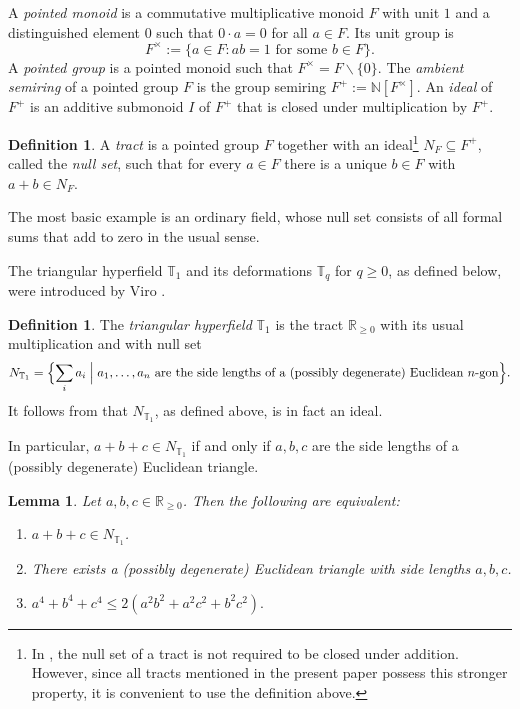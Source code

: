 \documentclass[12pt]{amsart}
\newtheorem{lemma}[theorem]{Lemma}
\theoremstyle{definition}
\newtheorem{definition}[theorem]{Definition}
\newcommand{\1}{\mathbf{1}}
\newcommand\N{{\mathbb N}}
\newcommand\R{{\mathbb R}}
\newcommand\T{{\mathbb T}}
\renewcommand{\setminus}{\backslash}
\newcommand{\mk}[2][]{\todo[color=orange, #1]{\textbf{Mario}: #2}}
\begin{document}
A \emph{pointed monoid} is a commutative multiplicative monoid $F$ with unit $1$ and
a distinguished element $0$ such that $0\cdot a=0$ for all $a\in F$. Its unit group is
\[
F^\times := \{a\in F : ab=1 \text{ for some } b\in F\}.
\]
A \emph{pointed group} is a pointed monoid such that $F^\times = F\setminus\{0\}$. The \emph{ambient semiring} of a pointed group $F$ is the group semiring $F^+ := \N[F^\times]$. An \emph{ideal} of $F^+$ is an additive submonoid $I$ of $F^+$ that is closed under multiplication by $F^+$.

\begin{definition}
A \emph{tract} is a pointed group $F$ together with an ideal\footnote{In \cite{Baker-Bowler19}, the null set of a tract is not required to be closed under addition. However, since all tracts mentioned in the present paper possess this stronger property, it is convenient to use the definition above.} $N_F\subseteq F^+$, called
the \emph{null set}, such that for every $a\in F$ there is a unique $b\in F$ with
$a+b\in N_F$.
\end{definition}

The most basic example is an ordinary field, whose null set
consists of all formal sums that add to zero in the usual sense.

The triangular hyperfield $\T_1$ and its deformations $\T_q$ for $q\ge 0$, as defined below, were
introduced by Viro \cite{Viro10}.

\begin{definition}
The \emph{triangular hyperfield} $\T_1$ is the tract $\R_{\ge 0}$ with its usual
multiplication and with null set
\[
N_{\T_1}
=
\Bigl\{\sum_i a_i \;\Big|\; a_1,\dots,a_n \text{ are the side lengths of a (possibly degenerate) Euclidean }
n\text{-gon}\Bigr\}.
\]
It follows from \cite[Lemma 3.5]{BHKL1} that $N_{\T_1}$, as defined above, is in fact an ideal.
\end{definition}

In particular, $a+b+c\in N_{\T_1}$ if and only if $a,b,c$ are the side lengths of a
(possibly degenerate) Euclidean triangle. 

\begin{lemma}
\label{lem:Heron-criterion}
Let $a,b,c\in \R_{\ge 0}$. Then the following are equivalent:
\begin{enumerate}
\item $a+b+c\in N_{\T_1}$.
\item There exists a (possibly degenerate) Euclidean triangle with side lengths
$a,b,c$.
\item
$a^4+b^4+c^4 \le 2(a^2b^2+a^2c^2+b^2c^2).$
\end{enumerate}
\end{lemma}
\end{document}
